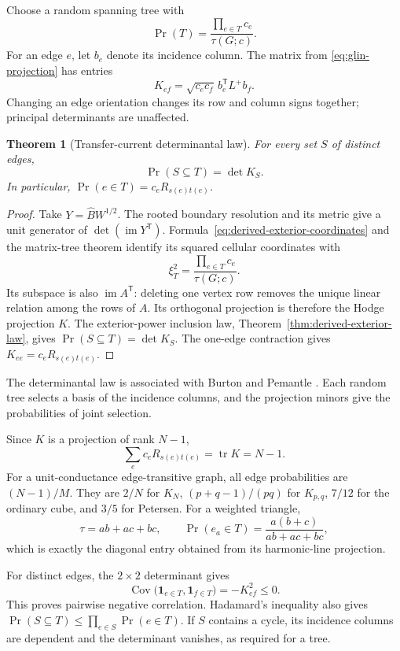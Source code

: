 \documentclass[11pt]{article}
\newtheorem{theorem}{Theorem}[section]
\theoremstyle{definition}
\theoremstyle{remark}
\begin{document}
Choose a random spanning tree with
\[
 \Pr(T)=\frac{\prod_{e\in T}c_e}{\tau(G;c)}.
\]
For an edge $e$, let $b_e$ denote its incidence column. The matrix from \eqref{eq:glin-projection} has entries
\[
 K_{ef}=\sqrt{c_ec_f}\,b_e^{\mathsf T}L^+b_f.
\]
Changing an edge orientation changes its row and column signs together; principal determinants are unaffected.

\begin{theorem}[Transfer-current determinantal law]\label{thm:glin-transfer-current}
For every set $S$ of distinct edges,
\begin{equation}\label{eq:glin-dpp}
 \Pr(S\subseteq T)=\det K_S.
\end{equation}
In particular, $\Pr(e\in T)=c_eR_{s(e)t(e)}$.
\end{theorem}
\begin{proof}
Take $Y=\widehat B W^{1/2}$. The rooted boundary resolution and its metric give a unit generator of $\det(\operatorname{im}Y^{\mathsf T})$. Formula~\eqref{eq:derived-exterior-coordinates} and the matrix-tree theorem identify its squared cellular coordinates with
\[
 \xi_T^2=\frac{\prod_{e\in T}c_e}{\tau(G;c)}.
\]
Its subspace is also $\operatorname{im}A^{\mathsf T}$: deleting one vertex row removes the unique linear relation among the rows of $A$. Its orthogonal projection is therefore the Hodge projection $K$. The exterior-power inclusion law, Theorem~\ref{thm:derived-exterior-law}, gives $\Pr(S\subseteq T)=\det K_S$. The one-edge contraction gives $K_{ee}=c_eR_{s(e)t(e)}$.
\end{proof}

The determinantal law is associated with Burton and Pemantle \cite{glinBurtonPemantle1993}. Each random tree selects a basis of the incidence columns, and the projection minors give the probabilities of joint selection.

Since $K$ is a projection of rank $N-1$,
\begin{equation}\label{eq:glin-foster}
 \sum_e c_eR_{s(e)t(e)}=\operatorname{tr}K=N-1.
\end{equation}
For a unit-conductance edge-transitive graph, all edge probabilities are $(N-1)/M$. They are $2/N$ for $K_N$, $(p+q-1)/(pq)$ for $K_{p,q}$, $7/12$ for the ordinary cube, and $3/5$ for Petersen. For a weighted triangle,
\[
 \tau=ab+ac+bc,\qquad
 \Pr(e_a\in T)=\frac{a(b+c)}{ab+ac+bc},
\]
which is exactly the diagonal entry obtained from its harmonic-line projection.

For distinct edges, the $2\times2$ determinant gives
\begin{equation}\label{eq:glin-negative-correlation}
 \operatorname{Cov}\bigl(\mathbf1_{e\in T},\mathbf1_{f\in T}\bigr)
 =-K_{ef}^2\le0.
\end{equation}
This proves pairwise negative correlation. Hadamard's inequality also gives $\Pr(S\subseteq T)\le\prod_{e\in S}\Pr(e\in T)$. If $S$ contains a cycle, its incidence columns are dependent and the determinant vanishes, as required for a tree.
\end{document}
